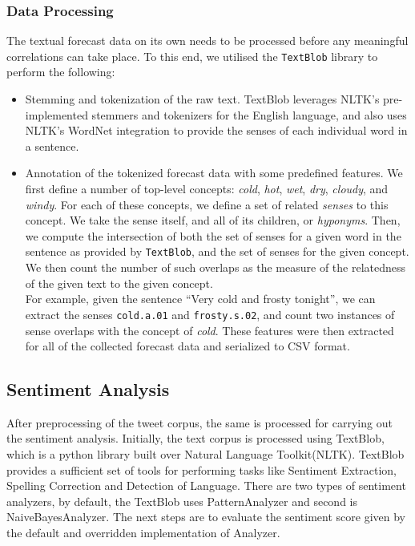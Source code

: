 \documentclass[a4paper,10pt]{article}
\begin{document}


    \subsubsection{Data Processing}

    The textual forecast data on its own needs to be processed before any meaningful correlations can take place. To this end, we utilised the \texttt{TextBlob} library to perform the following:
    \begin{itemize}
        \item{
            Stemming and tokenization of the raw text. TextBlob leverages NLTK's pre-implemented stemmers and tokenizers for the English language, and also uses NLTK's WordNet integration to provide the senses of each individual word in a sentence.
        }
        \item{
            Annotation of the tokenized forecast data with some predefined features. We first define a number of top-level concepts: \textit{cold}, \textit{hot}, \textit{wet}, \textit{dry}, \textit{cloudy}, and \textit{windy}. For each of these concepts, we define a set of related \textit{senses} to this concept. We take the sense itself, and all of its children, or \textit{hyponyms}. Then, we compute the intersection of both the set of senses for a given word in the sentence as provided by \texttt{TextBlob}, and the set of senses for the given concept. We then count the number of such overlaps as the measure of the relatedness of the given text to the given concept. \\
            For example, given the sentence ``Very cold and frosty tonight'', we can extract the senses \texttt{cold.a.01} and \texttt{frosty.s.02}, and count two instances of sense overlaps with the concept of \textit{cold}. These features were then extracted for all of the collected forecast data and serialized to CSV format.
        }
    \end{itemize}

	\subsection{Sentiment Analysis}
	
	After preprocessing of the tweet corpus, the same is processed for carrying out the sentiment analysis. Initially, the text corpus is processed using TextBlob, which is a python library built over Natural Language Toolkit(NLTK). TextBlob provides a sufficient set of tools for performing tasks like Sentiment Extraction, Spelling Correction and Detection of Language. There are two types of sentiment analyzers, by default, the TextBlob uses PatternAnalyzer and second is NaiveBayesAnalyzer. The next steps are to evaluate the sentiment score given by the default and overridden implementation of Analyzer. 
\end{document}
